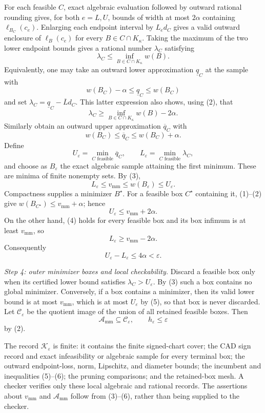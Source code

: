 For each feasible \(C\), exact algebraic evaluation followed by outward rational rounding gives, for both \(e=L,U\), bounds of width at most \(2\alpha\) containing \(\ell_{B_C}(c_e)\).  Enlarging each endpoint interval by \(L_ed_C\) gives a valid outward enclosure of \(\ell_B(c_e)\) for every \(B\in C\cap K_\kappa\).  Taking the maximum of the two lower endpoint bounds gives a rational number \(\lambda_C\) satisfying
\[
 \lambda_C\le\inf_{B\in C\cap K_\kappa}w(B). \tag{3}
\]
Equivalently, one may take an outward lower approximation \(\underline q_C\) at the sample with
\[
 w(B_C)-\alpha\le\underline q_C\le w(B_C)
\]
and set \(\lambda_C=\underline q_C-\overline Ld_C\).  This latter expression also shows, using (2), that
\[
 \lambda_C\ge \inf_{B\in C\cap K_\kappa}w(B)-2\alpha. \tag{4}
\]
Similarly obtain an outward upper approximation \(\overline q_C\) with
\[
 w(B_C)\le\overline q_C\le w(B_C)+\alpha.
\]
Define
\[
 U_\varepsilon=\min_{C\text{ feasible}}\overline q_C,
 \qquad
 L_\varepsilon=\min_{C\text{ feasible}}\lambda_C,
\]
and choose as \(B_\varepsilon\) the exact algebraic sample attaining the first minimum.  These are minima of finite nonempty sets.  By (3),
\[
 L_\varepsilon\le v_{\mathrm{mm}}
 \le w(B_\varepsilon)\le U_\varepsilon. \tag{5}
\]
Compactness supplies a minimizer \(B^\star\).  For a feasible box \(C^\star\) containing it, (1)--(2) give \(w(B_{C^\star})\le v_{\mathrm{mm}}+\alpha\); hence
\[
 U_\varepsilon\le v_{\mathrm{mm}}+2\alpha.
\]
On the other hand, (4) holds for every feasible box and its box infimum is at least \(v_{\mathrm{mm}}\), so
\[
 L_\varepsilon\ge v_{\mathrm{mm}}-2\alpha.
\]
Consequently
\[
 U_\varepsilon-L_\varepsilon\le4\alpha<\varepsilon. \tag{6}
\]

\emph{Step 4: outer minimizer boxes and local checkability.}
Discard a feasible box only when its certified lower bound satisfies \(\lambda_C>U_\varepsilon\).  By (3) such a box contains no global minimizer.  Conversely, if a box contains a minimizer, then its valid lower bound is at most \(v_{\mathrm{mm}}\), which is at most \(U_\varepsilon\) by (5), so that box is never discarded.  Let \(\mathcal C_\varepsilon\) be the quotient image of the union of all retained feasible boxes.  Then
\[
 \mathcal A_{\mathrm{mm}}\subseteq\mathcal C_\varepsilon,
 \qquad h_\varepsilon\le\varepsilon
\]
by (2).

The record \(\mathscr K_\varepsilon\) is finite: it contains the finite signed-chart cover; the CAD sign record and exact infeasibility or algebraic sample for every terminal box; the outward endpoint-loss, norm, Lipschitz, and diameter bounds; the incumbent and inequalities (5)--(6); the pruning comparisons; and the retained-box mesh.  A checker verifies only these local algebraic and rational records.  The assertions about \(v_{\mathrm{mm}}\) and \(\mathcal A_{\mathrm{mm}}\) follow from (3)--(6), rather than being supplied to the checker.

